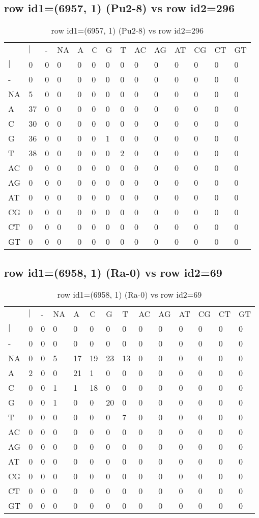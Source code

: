 \subsection{row id1=(6957, 1) (Pu2-8) vs row id2=296}
\begin{center}
\begin{longtable}{|l|l|l|l|l|l|l|l|l|l|l|l|l|l|}
\caption{row id1=(6957, 1) (Pu2-8) vs row id2=296} \label{table_dm164}\\
\hline
\\
\hline
&$|$&-&NA&A&C&G&T&AC&AG&AT&CG&CT&GT\\
$|$&0&0&0&0&0&0&0&0&0&0&0&0&0\\
-&0&0&0&0&0&0&0&0&0&0&0&0&0\\
NA&5&0&0&0&0&0&0&0&0&0&0&0&0\\
A&37&0&0&0&0&0&0&0&0&0&0&0&0\\
C&30&0&0&0&0&0&0&0&0&0&0&0&0\\
G&36&0&0&0&0&1&0&0&0&0&0&0&0\\
T&38&0&0&0&0&0&2&0&0&0&0&0&0\\
AC&0&0&0&0&0&0&0&0&0&0&0&0&0\\
AG&0&0&0&0&0&0&0&0&0&0&0&0&0\\
AT&0&0&0&0&0&0&0&0&0&0&0&0&0\\
CG&0&0&0&0&0&0&0&0&0&0&0&0&0\\
CT&0&0&0&0&0&0&0&0&0&0&0&0&0\\
GT&0&0&0&0&0&0&0&0&0&0&0&0&0\\
\hline
\end{longtable}
\end{center}

\subsection{row id1=(6958, 1) (Ra-0) vs row id2=69}
\begin{center}
\begin{longtable}{|l|l|l|l|l|l|l|l|l|l|l|l|l|l|}
\caption{row id1=(6958, 1) (Ra-0) vs row id2=69} \label{table_dm166}\\
\hline
\\
\hline
&$|$&-&NA&A&C&G&T&AC&AG&AT&CG&CT&GT\\
$|$&0&0&0&0&0&0&0&0&0&0&0&0&0\\
-&0&0&0&0&0&0&0&0&0&0&0&0&0\\
NA&0&0&5&17&19&23&13&0&0&0&0&0&0\\
A&2&0&0&21&1&0&0&0&0&0&0&0&0\\
C&0&0&1&1&18&0&0&0&0&0&0&0&0\\
G&0&0&1&0&0&20&0&0&0&0&0&0&0\\
T&0&0&0&0&0&0&7&0&0&0&0&0&0\\
AC&0&0&0&0&0&0&0&0&0&0&0&0&0\\
AG&0&0&0&0&0&0&0&0&0&0&0&0&0\\
AT&0&0&0&0&0&0&0&0&0&0&0&0&0\\
CG&0&0&0&0&0&0&0&0&0&0&0&0&0\\
CT&0&0&0&0&0&0&0&0&0&0&0&0&0\\
GT&0&0&0&0&0&0&0&0&0&0&0&0&0\\
\hline
\end{longtable}
\end{center}

